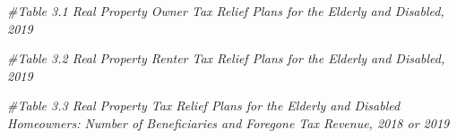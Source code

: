 \documentclass[
]{book}
\newenvironment{Shaded}{\begin{snugshade}}{\end{snugshade}}
\newcommand{\CommentTok}[1]{\textcolor[rgb]{0.56,0.35,0.01}{\textit{#1}}}
\begin{document}
\begin{Shaded}
\begin{Highlighting}[]
\CommentTok{\#Table 3.1 Real Property Owner Tax Relief Plans for the Elderly and Disabled, 2019}

\CommentTok{\#Table 3.2 Real Property Renter Tax Relief Plans for the Elderly and Disabled, 2019}

\CommentTok{\#Table 3.3 Real Property Tax Relief Plans for the Elderly and Disabled Homeowners: Number of Beneficiaries and Foregone Tax Revenue, 2018 or 2019}
\end{Highlighting}
\end{Shaded}
\end{document}
